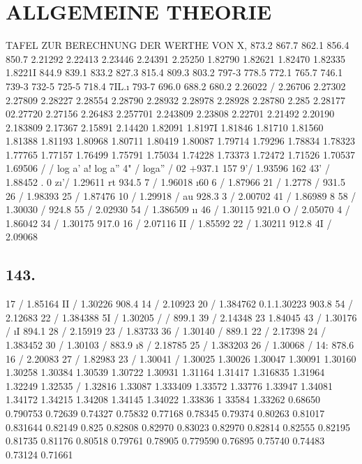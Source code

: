\documentclass[12pt,a4paper]{article}
\begin{document}
\newpage


\section*{ALLGEMEINE THEORIE}
TAFEL ZUR BERECHNUNG DER WERTHE VON X, 873.2 867.7 862.1 856.4 850.7 2.21292 2.22413 2.23446 2.24391 2.25250 1.82790 1.82621 1.82470 1.82335 1.8221I 844.9 839.1 833.2 827.3 815.4 809.3 803.2 797-3 778.5 772.1 765.7 746.1 739-3 732-5 725-5 718.4 7IL.\i{} 793-7 696.0 688.2 680.2 2.26022 / 2.26706 2.27302 2.27809 2.28227 2.28554 2.28790 2.28932 2.28978 2.28928 2.28780 2.285 2.28177 02.27720 2.27156 2.26483 2.257701 2.243809 2.23808 2.22701 2.21492 2.20190 2.183809 2.17367 2.15891 2.14420 1.82091 1.8197I 1.81846 1.81710 1.81560 1.81388 1.81193 1.80968 1.80711 1.80419 1.80087 1.79714 1.79296 1.78834 1.78323 1.77765 1.77157 1.76499 1.75791 1.75034 1.74228 1.73373 1.72472 1.71526 1.70537 1.69506 / / log a' a! log a'' 4" / loga'' / 02
$+ 937.1$
157\textdegree{} 9'/ 1.93596 162\textdegree{} 43' / 1.88452 . 0\textdegree{} z\i{}'/ 1.29611 rt 934.5 7 / 1.96018 \i{}60 6 / 1.87966 21 / 1.2778 / 931.5 26 / 1.98393 25 / 1.87476 10 /  1.29918 / au 928.3 3 / 2.00702 41 / 1.86989 8 58 / 1.30030 / 924.8 55 / 2.02930 54 / 1.386509 \i{}\i{} 46 / 1.30115 921.0 O / 2.05070 4 / 1.86042 34 / 1.30175 917.0 16 / 2.07116 II / 1.85592 22 / 1.30211 912.8 4I / 2.09068

\subsection*{143.}
17 / 1.85164 II / 1.30226 908.4 14 / 2.10923 20 / 1.384762 0.1.1.30223 903.8 54 / 2.12683 22 / 1.384388 5I / 1.30205 / / 899.1 39 / 2.14348 23 1.84045 43 / 1.30176 / \i{}I 894.1 28 / 2.15919 23 /  1.83733 36 / 1.30140 / 889.1 22 / 2.17398 24 / 1.383452 30 / 1.30103 / 883.9 \i{}8 / 2.18785 25 / 1.383203 26 / 1.30068 / 14: 878.6 16 / 2.20083 27 / 1.82983 23 / 1.30041 / 1.30025 1.30026 1.30047 1.30091 1.30160 1.30258 1.30384 1.30539 1.30722 1.30931 1.31164 1.31417 1.316835 1.31964 1.32249 1.32535 / 1.32816 1.33087 1.333409 1.33572 1.33776 1.33947 1.34081 1.34172 1.34215 1.34208 1.34145 1.34022 1.33836 1 33584 1.33262 0.68650 0.790753 0.72639 0.74327 0.75832 0.77168 0.78345 0.79374 0.80263 0.81017 0.831644 0.82149 0.825 0.82808 0.82970 0.83023 0.82970 0.82814 0.82555 0.82195 0.81735 0.81176 0.80518 0.79761 0.78905 0.779590 0.76895 0.75740 0.74483 0.73124 0.71661
\end{document}
